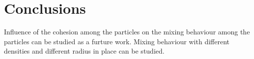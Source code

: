 \documentclass[preprint,12pt]{elsarticle}
\begin{document}
\FloatBarrier%
\section{Conclusions}
\label{sec:conclusions}




Influence of the cohesion among the particles on the mixing behaviour among
the particles can be studied as a furture work. Mixing behaviour with
different densities and different radius in place can be studied.






\end{document}
